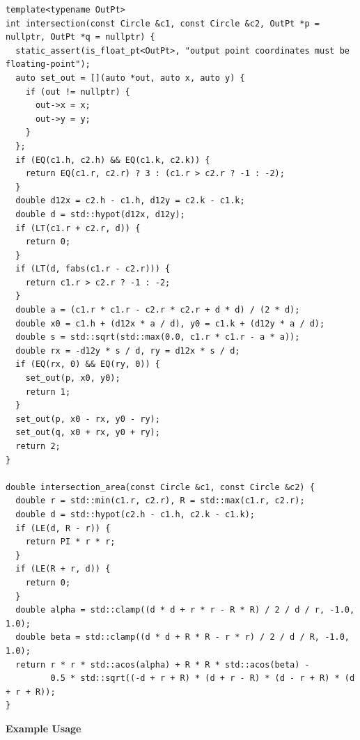 \begin{lstlisting}[style=cpp]
template<typename OutPt>
int intersection(const Circle &c1, const Circle &c2, OutPt *p = nullptr, OutPt *q = nullptr) {
  static_assert(is_float_pt<OutPt>, "output point coordinates must be floating-point");
  auto set_out = [](auto *out, auto x, auto y) {
    if (out != nullptr) {
      out->x = x;
      out->y = y;
    }
  };
  if (EQ(c1.h, c2.h) && EQ(c1.k, c2.k)) {
    return EQ(c1.r, c2.r) ? 3 : (c1.r > c2.r ? -1 : -2);
  }
  double d12x = c2.h - c1.h, d12y = c2.k - c1.k;
  double d = std::hypot(d12x, d12y);
  if (LT(c1.r + c2.r, d)) {
    return 0;
  }
  if (LT(d, fabs(c1.r - c2.r))) {
    return c1.r > c2.r ? -1 : -2;
  }
  double a = (c1.r * c1.r - c2.r * c2.r + d * d) / (2 * d);
  double x0 = c1.h + (d12x * a / d), y0 = c1.k + (d12y * a / d);
  double s = std::sqrt(std::max(0.0, c1.r * c1.r - a * a));
  double rx = -d12y * s / d, ry = d12x * s / d;
  if (EQ(rx, 0) && EQ(ry, 0)) {
    set_out(p, x0, y0);
    return 1;
  }
  set_out(p, x0 - rx, y0 - ry);
  set_out(q, x0 + rx, y0 + ry);
  return 2;
}

double intersection_area(const Circle &c1, const Circle &c2) {
  double r = std::min(c1.r, c2.r), R = std::max(c1.r, c2.r);
  double d = std::hypot(c2.h - c1.h, c2.k - c1.k);
  if (LE(d, R - r)) {
    return PI * r * r;
  }
  if (LE(R + r, d)) {
    return 0;
  }
  double alpha = std::clamp((d * d + r * r - R * R) / 2 / d / r, -1.0, 1.0);
  double beta = std::clamp((d * d + R * R - r * r) / 2 / d / R, -1.0, 1.0);
  return r * r * std::acos(alpha) + R * R * std::acos(beta) -
         0.5 * std::sqrt((-d + r + R) * (d + r - R) * (d - r + R) * (d + r + R));
}
\end{lstlisting}
\textbf{Example Usage}\par
